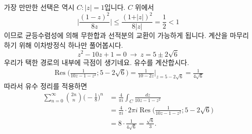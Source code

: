 \documentclass[serif]{beamer}
\begin{document}
\begin{frame}{}
    가장 만만한 선택은 역시 $C:\vert z\vert=1$입니다. $C$ 위에서
    \[
        \biggl\vert\frac{(1-z)^2}{8z}\biggr\vert\leq\frac{(1+\vert z\vert)^2}{8\vert z\vert}=\frac{1}{2}<1
    \]
    이므로 균등수렴성에 의해 무한합과 선적분의 교환이 가능하게 됩니다. 계산을 마무리하기 위해 이차방정식 하나만 풀어봅시다.
    \[
        z^2-10z+1=0~\longrightarrow~ z=5\pm2\sqrt{6}
    \]
    우리가 택한 경로의 내부에 극점이 생기네요. 유수를 계산합시다.
    \[
        \begin{aligned}
            \operatorname{Res}\biggl(\frac{1}{10z-1-z^2};5-2\sqrt{6}\biggr)=\frac{1}{10-2z}\biggr\vert_{z=5-2\sqrt{6}}=\frac{1}{4\sqrt{6}}
        \end{aligned}
    \]
    따라서 유수 정리를 적용하면
    \[
        \begin{aligned}
            \sum_{n=0}^\infty\binom{2n}{n}\biggl(-\frac{1}{8}\biggr)^n&=\frac{4}{\pi i}\int_C\frac{dz}{10z-1-z^2}\\
            &=\frac{4}{\pi i}\cdot2\pi i\operatorname{Res}\biggl(\frac{1}{10z-1-z^2};5-2\sqrt{6}\biggr)\\
            &=8\cdot\frac{1}{4\sqrt{6}}=\frac{\sqrt{6}}{3}.
        \end{aligned}
    \]
\end{frame}
\end{document}
